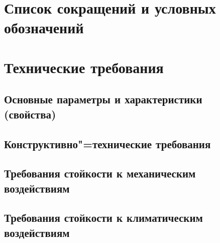 \documentclass[columnsxxiv,columnsxxvii,pointsubsection]{eskdtext}
\begin{document}

	\maketitle
	
	\tableofcontents

	\newpage
	\label{1int}
	
	
	\newpage
	\section*{\centering Список сокращений и условных обозначений}
	
	
	\newpage
	\section{Технические требования}
	
	\subsection{Основные параметры и характеристики (свойства)}
	
	\point
	\label{t_capacity}
	
	\point
	\label{t_volt}
	
	\point
	\label{t_undervolt}
	
	\point
	\label{t_short}
	
%	
	
	\subsection{Конструктивно"=технические требования}
	\point
	\label{t_kt_m}
	
	\point
	\label{t_kt_pok}
	
	
	\subsection{Требования стойкости к механическим воздействиям}
%	
	\point
	\label{t_m_shsv_st}
	
	\point
	\label{t_m_ydar_mng_st}
	
	\point
	\label{t_m_ydar_mng_pr}
	
%	
	\point
	\label{t_m_noise}
	
	\point
	\label{t_m_yskor}
	
	
	\subsection{Требования стойкости к климатическим воздействиям}
	\point
	\label{t_k_p}
	
	\point
	\label{t_k_m}
	
	\point
	\label{t_k_vlg}
	
	\point
	\label{t_k_ckl}
	
%	
	\point
	\label{t_k_dav_t}
	
	\point
	\label{t_k_mist}
	
	\point
	\label{t_k_rosa}
	
\end{document}
